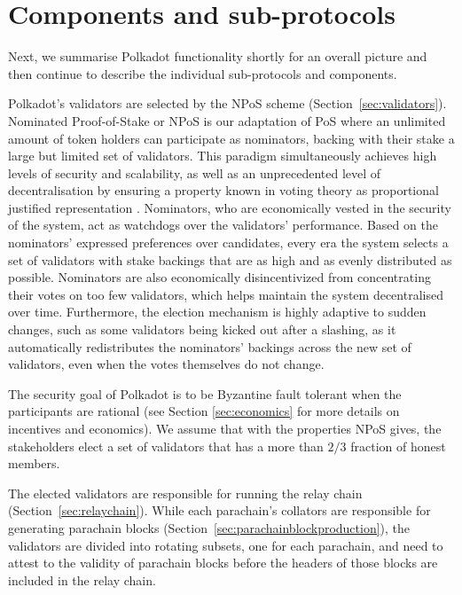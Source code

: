 \section{Components and sub-protocols}\label{sec:components}
Next, we summarise Polkadot functionality shortly for an overall picture and then continue to describe the individual sub-protocols and components. %

Polkadot's validators are selected by the NPoS scheme (Section~\ref{sec:validators}). Nominated Proof-of-Stake or NPoS is our adaptation of PoS where an unlimited amount of token holders can participate as nominators, backing with their stake a large but limited set of validators. This paradigm simultaneously achieves high levels of security and scalability, as well as an unprecedented level of decentralisation by ensuring a property known in voting theory as proportional justified representation \cite{sanchez2017proportional, brill2017phragmen}. Nominators, who are economically vested in the security of the system, act as watchdogs over the validators' performance. Based on the nominators' expressed preferences over candidates, every era the system selects a set of validators with stake backings that are as high and as evenly distributed as possible. Nominators are also economically disincentivized from concentrating their votes on too few validators, which helps maintain the system decentralised over time. Furthermore, the election mechanism is highly adaptive to sudden changes, such as some validators being kicked out after a slashing, as it automatically redistributes the nominators' backings across the new set of validators, even when the votes themselves do not change.

The security goal of Polkadot is to be Byzantine fault tolerant when the participants are rational (see Section \ref{sec:economics} for more details on incentives and economics). We assume that with the properties NPoS gives, the stakeholders elect a set of validators that has a more than $2/3$ fraction of honest members.

The elected validators are responsible for running the relay chain (Section~\ref{sec:relaychain}). While each parachain's collators are responsible for generating parachain blocks (Section~\ref{sec:parachainblockproduction}), the validators are divided into rotating subsets, one for each parachain, and need to attest to the validity of parachain blocks before the headers of those blocks are included in the relay chain.

